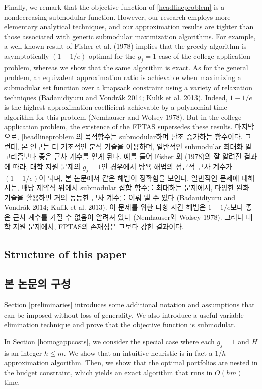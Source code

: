 \documentclass[11pt]{article} %
\theoremstyle{definition}
\theoremstyle{definition}
\begin{document}
\ifen
Finally, we remark that the objective function of \eqref{headlineproblem} is a nondecreasing submodular function. However, our research employs more elementary analytical techniques, and our approximation results are tighter than those associated with generic submodular maximization algorithms. For example, a well-known result of Fisher et al. (1978) implies that the greedy algorithm is asymptotically $(1 - 1/e)$-optimal for the $g_j = 1$ case of the college application problem, whereas we show that the same algorithm is exact. As for the general problem, an equivalent approximation ratio is achievable when maximizing a submodular set function over a knapsack constraint using a variety of relaxation techniques (Badanidiyuru and Vondrák 2014; Kulik et al. 2013). Indeed, $1 - 1/e$ is the highest approximation coefficient achievable by a polynomial-time algorithm for this problem (Nemhauser and Wolsey 1978). But in the college application problem, the existence of the FPTAS supersedes these results.
\else
마지막으로, \eqref{headlineproblem}의 목적함수는 submodular하며 단조 증가하는 함수이다. 그런데, 본 연구는 더 기초적인 분석 기술을 이용하며, 일반적인 submodular 최대화 알고리즘보다 좋은 근사 계수를 얻게 된다. 예를 들어 Fisher 외 (1978)의 잘 알려진 결과에 따라, 대학 지원 문제의 $g_j = 1$인 경우에서 탐욕 해법의 점근적 근사 계수가 $(1 - 1/e)$이 되며, 본 논문에서 같은 해법이 정확함을 보인다. 일반적인 문제에 대해서는, 배낭 제약식 위에서 submodular 집합 함수를 최대하는 문제에서, 다양한 완화 기술을 활용하면 거의 동등한 근사 계수를 이뤄 낼 수 있다 (Badanidiyuru and Vondrák 2014; Kulik et al. 2013). 이 문제를 위한 다항 시간 해법은 $1 - 1/e$보다 좋은 근사 계수를 가질 수 없음이 알려져 있다 (Nemhauser와 Wolsey 1978). 그러나 대학 지원 문제에서, FPTAS의 존재성은 그보다 강한 결과이다.
\fi

\ifen \subsection{Structure of this paper} \else \subsection{본 논문의 구성}\fi
\ifen Section \ref{preliminaries} introduces some additional notation and assumptions that can be imposed without loss of generality. We also introduce a useful variable-elimination technique and prove that the objective function is submodular. 

In Section \ref{homogappcosts}, we consider the special case where each $g_j = 1$ and $H$ is an integer $h \leq m$.  We show that an intuitive heuristic is in fact a $1/h$-approximation algorithm. Then, we show that the optimal portfolios are nested in the budget constraint, which yields an exact algorithm that runs in $O(hm)$ time. 
\end{document}
